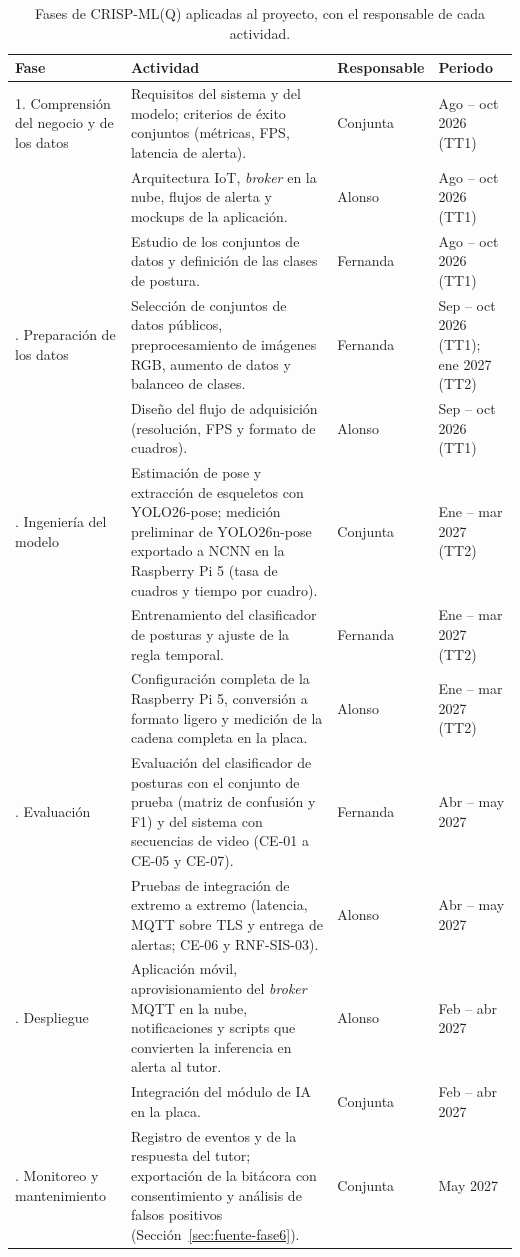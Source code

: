 \documentclass[12pt,a4paper,oneside]{book}
\theoremstyle{plain}
\theoremstyle{definition}
\theoremstyle{remark}
\begin{document}
\begin{table}[H]
\centering
\caption{Fases de CRISP-ML(Q) aplicadas al proyecto, con el responsable de cada actividad.}
\label{tab:fases-crisp}
\footnotesize
\begin{tabular}{L{2.2cm}L{6.4cm}L{1.9cm}L{2.6cm}}
\toprule
\textbf{Fase} & \textbf{Actividad} & \textbf{Responsable} & \textbf{Periodo} \\
. Comprensión del negocio y de los datos & Requisitos del sistema y del modelo; criterios de éxito conjuntos (métricas, FPS, latencia de alerta). & Conjunta & Ago -- oct 2026 (TT1) \\
 & Arquitectura IoT, \textit{broker} en la nube, flujos de alerta y mockups de la aplicación. & Alonso & Ago -- oct 2026 (TT1) \\
 & Estudio de los conjuntos de datos y definición de las clases de postura. & Fernanda & Ago -- oct 2026 (TT1) \\
. Preparación de los datos & Selección de conjuntos de datos públicos, preprocesamiento de imágenes RGB, aumento de datos y balanceo de clases. & Fernanda & Sep -- oct 2026 (TT1); ene 2027 (TT2) \\
 & Diseño del flujo de adquisición (resolución, FPS y formato de cuadros). & Alonso & Sep -- oct 2026 (TT1) \\
. Ingeniería del modelo & Estimación de pose y extracción de esqueletos con YOLO26-pose; medición preliminar de YOLO26n-pose exportado a NCNN en la Raspberry Pi 5 (tasa de cuadros y tiempo por cuadro). & Conjunta & Ene -- mar 2027 (TT2) \\
 & Entrenamiento del clasificador de posturas y ajuste de la regla temporal. & Fernanda & Ene -- mar 2027 (TT2) \\
 & Configuración completa de la Raspberry Pi 5, conversión a formato ligero y medición de la cadena completa en la placa. & Alonso & Ene -- mar 2027 (TT2) \\
. Evaluación & Evaluación del clasificador de posturas con el conjunto de prueba (matriz de confusión y F1) y del sistema con secuencias de video (CE-01 a CE-05 y CE-07). & Fernanda & Abr -- may 2027 \\
 & Pruebas de integración de extremo a extremo (latencia, MQTT sobre TLS y entrega de alertas; CE-06 y RNF-SIS-03). & Alonso & Abr -- may 2027 \\
. Despliegue & Aplicación móvil, aprovisionamiento del \textit{broker} MQTT en la nube, notificaciones y scripts que convierten la inferencia en alerta al tutor. & Alonso & Feb -- abr 2027 \\
 & Integración del módulo de IA en la placa. & Conjunta & Feb -- abr 2027 \\
. Monitoreo y mantenimiento & Registro de eventos y de la respuesta del tutor; exportación de la bitácora con consentimiento y análisis de falsos positivos (Sección~\ref{sec:fuente-fase6}). & Conjunta & May 2027 \\
\bottomrule
\end{tabular}
\end{table}
\end{document}
